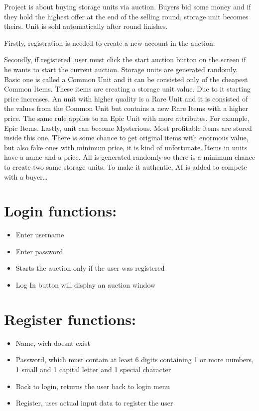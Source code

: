 \documentclass[
]{report}
\providecommand{\tightlist}{%
  \setlength{\itemsep}{0pt}\setlength{\parskip}{0pt}}
\begin{document}
Project is about buying storage units via auction. Buyers bid some money
and if they hold the highest offer at the end of the selling round,
storage unit becomes theirs. Unit is sold automatically after round
finishes.

Firstly, registration is needed to create a new account in the auction.

Secondly, if registered ,user must click the start auction button on the screen if he wants to start the current auction. Storage units are generated randomly. Basic one is called a Common Unit and it can be
consisted only of the cheapest Common Items. These items are creating a
storage unit value. Due to it starting price increases. An unit with
higher quality is a Rare Unit and it is consisted of the values from the
Common Unit but contains a new Rare Items with a higher price. The same
rule applies to an Epic Unit with more attributes. For example, Epic
Items. Lastly, unit can become Mysterious. Most profitable items are
stored inside this one. There is some chance to get original items with
enormous value, but also fake ones with minimum price, it is kind of
unfortunate. Items in units have a name and a price. All is generated
randomly so there is a minimum chance to create two same storage units.
To make it authentic, AI is added to compete with a buyer\ldots{}

\hypertarget{login-functions}{%
\section{Login functions:}\label{login-functions}}

\begin{itemize}
\tightlist
\item
  Enter username
\item
  Enter password
\item
  Starts the auction only if the user was registered
\item
  Log In button will display an auction window
\end{itemize}

\hypertarget{register-functions}{%
\section{Register functions:}\label{register-functions}}

\begin{itemize}
\tightlist
\item
  Name, wich doesnt exist
\item
  Password, which must contain at least 6 digits containing 1 or
  more numbers, 1 small and 1 capital letter and 1 special character
\item
  Back to login, returns the user back to login menu
\item
  Register, uses actual input data to register the user
\end{itemize}
\end{document}
